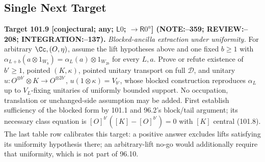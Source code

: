 \subsection{Single Next Target}

\textbf{Target 101.9 [conjectural; any; \(\mathsf L0\); \(\to\mathsf R0^u\)] (NOTE:--359; REVIEW:--208; INTEGRATION:--137).}
\emph{Blocked-ancilla extraction under uniformity.} For arbitrary \(\Cc,(O,\eta)\), assume the lift hypotheses above
and one fixed \(b\ge1\) with \(\alpha_{L+b}(a\otimes1_{W_b})=\alpha_L(a)\otimes1_{W_{2b}}\) for every \(L,a\).
Prove or refute existence of \(b'\ge1\), pointed \((K,\kappa)\), pointed unitary transport on full \(\mathcal D\), and
unitary \(u:O^{\otimes b'}\otimes K\to O^{\otimes2b'}\), \(u(1\otimes\kappa)=V_{b'}\), whose blocked construction
reproduces \(\alpha_L\) up to \(V_L\)-fixing unitaries of uniformly bounded support.
No occupation, translation or unchanged-side assumption may be added. First establish sufficiency of the blocked
form by 101.1 and 96.2's block/tail argument; its necessary class equation is
\([O]^{b'}([K]-[O]^{b'})=0\) with \([K]\) central (101.8).
The last table row calibrates this target: a positive answer excludes lifts satisfying its uniformity hypothesis
there; an arbitrary-lift no-go would additionally require that uniformity, which is not part of 96.10.
